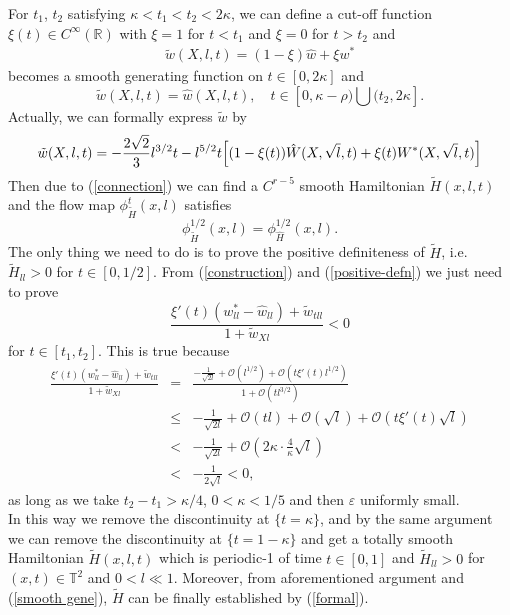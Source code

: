 \documentclass{amsart}
\begin{document}
For $t_1$, $t_2$ satisfying $\kappa<t_1<t_2<2\kappa$, we can define a cut-off function $\xi(t)\in C^\infty({\mathbb{R}})$ with $\xi=1$ for $t<t_1$ and $\xi=0$ for $t>t_2$ and
\begin{eqnarray}\label{construction}
\tilde{w}(X,l,t)=(1-\xi)\hat{w}+\xi w^*
\end{eqnarray} 
becomes a smooth generating function on $t\in[0,2\kappa]$ and 
\[
\tilde{w}(X,l,t)=\hat{w}(X,l,t), \quad t\in[0,\kappa-\rho)\bigcup(t_2,2\kappa].
\]
Actually, we can formally express $\tilde{w}$ by
\begin{eqnarray}\label{smooth gene}
\tilde{w}(X,l,t)=-\frac{2\sqrt{2}}{3}l^{3/2}t-l^{5/2}t\Big{[}(1-\xi(t))\hat{W}(X,\sqrt{l},t)+\xi (t)W^*(X,\sqrt{l},t)\Big{]}
\end{eqnarray}
Then due to (\ref{connection}) we can find a $C^{r-5}$ smooth Hamiltonian $\tilde{H}(x,l,t)$ and the flow map $\phi_{\tilde{H}}^t(x,l)$ satisfies
\[
\phi_{\tilde{H}}^{1/2}(x,l)=\phi_{\hat{H}}^{1/2}(x,l).
\]
The only thing we need to do is to prove the positive definiteness of $\tilde{H}$, i.e. $\tilde{H}_{ll}>0$ for $t\in[0,1/2]$. From (\ref{construction}) and (\ref{positive-defn}) we just need to prove
\[
\frac{\xi'(t)(w^*_{ll}-\hat{w}_{ll})+\tilde{w}_{tll}}{1+\tilde{w}_{Xl}}<0
\]
for $t\in[t_1,t_2]$.
This is true because
\begin{eqnarray}
\frac{\xi'(t)(w^*_{ll}-\hat{w}_{ll})+\tilde{w}_{tll}}{1+\tilde{w}_{Xl}}&=&\frac{-\frac{1}{\sqrt{2l}}+{\mathcal{O}}(l^{1/2})+{\mathcal{O}}(t\xi'(t)l^{1/2})}{1+{\mathcal{O}}(tl^{3/2})}\nonumber\\
&\leq&-\frac{1}{\sqrt{2l}}+{\mathcal{O}}(tl)+{\mathcal{O}}(\sqrt l)+{\mathcal{O}}(t\xi'(t)\sqrt l)\nonumber\\
&<&-\frac{1}{\sqrt {2l}}+{\mathcal{O}}(2\kappa\cdot\frac{4}{\kappa}\sqrt l)\nonumber\\
&<&-\frac{1}{2\sqrt {l}}<0,
\end{eqnarray}
as long as we take $t_2-t_1>\kappa/4$, $0<\kappa<1/5$ and then ${\varepsilon}$ uniformly small. \\

In this way we remove the discontinuity at $\{t=\kappa\}$, and by the same argument we can remove the discontinuity at $\{t=1-\kappa\}$ and get a totally smooth Hamiltonian $\tilde{H}(x,l,t)$ which is periodic-1 of time $t\in[0,1]$ and $\tilde{H}_{ll}>0$ for $(x,t)\in{\mathbb{T}}^2$ and $0<l\ll1$. Moreover, from aforementioned argument and (\ref{smooth gene}), $\tilde{H}$ can be finally established by (\ref{formal}).
\end{document}
